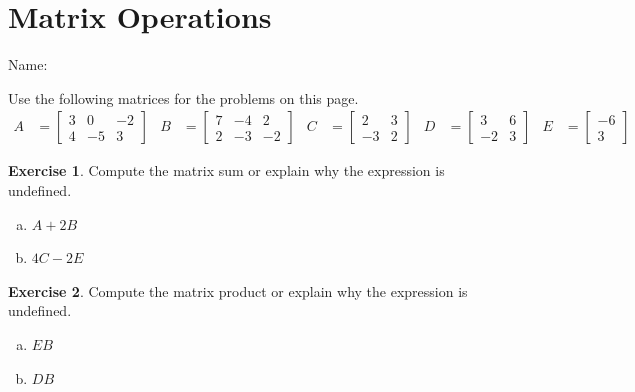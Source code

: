 \documentclass[10pt]{book}
\theoremstyle{definition}
\newtheorem{exercise}{Exercise}[section]
\newcommand{\name}[1][2.5in]{\vspace{-2.3em}\hfill Name: \underline{\hspace{#1}}}
\begin{document}
\newpage


\setcounter{section}{0}

\section{Matrix Operations}
\name

Use the following matrices for the problems on this page.
\begin{align*}
A &= \begin{bmatrix}3&0&-2\\4&-5&3\end{bmatrix} &
B &= \begin{bmatrix}7&-4&2\\2&-3&-2\end{bmatrix} &
C &= \begin{bmatrix}2&3\\-3&2\end{bmatrix} &
D &= \begin{bmatrix}3&6\\-2&3\end{bmatrix} &
E &= \begin{bmatrix}-6\\3\end{bmatrix}
\end{align*}

\begin{exercise} %
	Compute the matrix sum or explain why the expression is undefined.
	\begin{multicols}{2}
		\begin{enumerate}[(a)]
			\item $A+2B$
			\item $4C-2E$
		\end{enumerate}
	\end{multicols}
\end{exercise}
\vfill


\begin{exercise} %
	Compute the matrix product or explain why the expression is undefined.
	\begin{multicols}{2}
		\begin{enumerate}[(a)]
			\item $EB$
			\item $DB$
		\end{enumerate}
	\end{multicols}
\end{exercise}
\vfill
\end{document}
